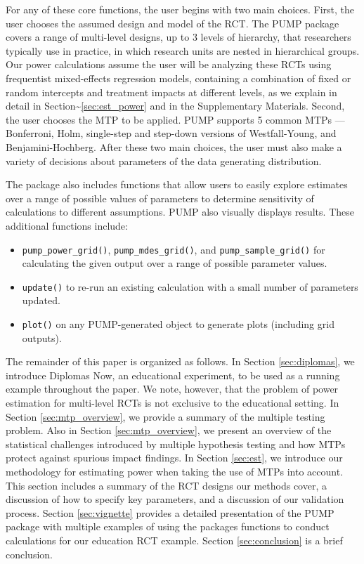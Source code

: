 \documentclass[
]{article}
\providecommand{\tightlist}{%
  \setlength{\itemsep}{0pt}\setlength{\parskip}{0pt}}
\begin{document}
For any of these core functions, the user begins with two main choices.
First, the user chooses the assumed design and model of the RCT. The
PUMP package covers a range of multi-level designs, up to 3 levels of
hierarchy, that researchers typically use in practice, in which research
units are nested in hierarchical groups. Our power calculations assume
the user will be analyzing these RCTs using frequentist mixed-effects
regression models, containing a combination of fixed or random
intercepts and treatment impacts at different levels, as we explain in
detail in Section\textasciitilde{}\ref{sec:est_power} and in the
Supplementary Materials. Second, the user chooses the MTP to be applied.
PUMP supports 5 common MTPs --- Bonferroni, Holm, single-step and
step-down versions of Westfall-Young, and Benjamini-Hochberg. After
these two main choices, the user must also make a variety of decisions
about parameters of the data generating distribution.

The package also includes functions that allow users to easily explore
estimates over a range of possible values of parameters to determine
sensitivity of calculations to different assumptions. PUMP also visually
displays results. These additional functions include:

\begin{itemize}
\tightlist
\item
  \texttt{pump\_power\_grid()}, \texttt{pump\_mdes\_grid()}, and
  \texttt{pump\_sample\_grid()} for calculating the given output over a
  range of possible parameter values.
\item
  \texttt{update()} to re-run an existing calculation with a small
  number of parameters updated.
\item
  \texttt{plot()} on any PUMP-generated object to generate plots
  (including grid outputs).
\end{itemize}

The remainder of this paper is organized as follows. In Section
\ref{sec:diplomas}, we introduce Diplomas Now, an educational
experiment, to be used as a running example throughout the paper. We
note, however, that the problem of power estimation for multi-level RCTs
is not exclusive to the educational setting. In Section
\ref{sec:mtp_overview}, we provide a summary of the multiple testing
problem. Also in Section \ref{sec:mtp_overview}, we present an overview
of the statistical challenges introduced by multiple hypothesis testing
and how MTPs protect against spurious impact findings. In Section
\ref{sec:est}, we introduce our methodology for estimating power when
taking the use of MTPs into account. This section includes a summary of
the RCT designs our methods cover, a discussion of how to specify key
parameters, and a discussion of our validation process. Section
\ref{sec:vignette} provides a detailed presentation of the PUMP package
with multiple examples of using the packages functions to conduct
calculations for our education RCT example. Section \ref{sec:conclusion}
is a brief conclusion.
\end{document}
